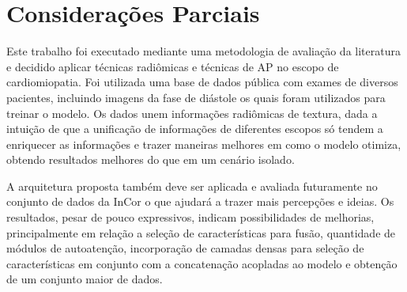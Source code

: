 \chapter{Considerações Parciais}
\label{chap:consideracoes_parciais}

Este trabalho foi executado mediante uma metodologia de avaliação da literatura e decidido aplicar técnicas radiômicas e técnicas de \gls{AP} no escopo de cardiomiopatia. Foi utilizada uma base de dados pública com exames de diversos pacientes, incluindo imagens da fase de diástole os quais foram utilizados para treinar o modelo. Os dados unem informações radiômicas de textura, dada a intuição de que a unificação de informações de diferentes escopos só tendem a enriquecer as informações e trazer maneiras melhores em como o modelo otimiza, obtendo resultados melhores do que em um cenário isolado.

A arquitetura proposta também deve ser aplicada e avaliada futuramente no conjunto de dados da \gls{InCor} o que ajudará a trazer mais percepções e ideias. Os resultados, pesar de pouco expressivos, indicam possibilidades de melhorias, principalmente em relação a seleção de características para fusão, quantidade de módulos de autoatenção, incorporação de camadas densas para seleção de características em conjunto com a concatenação acopladas ao modelo e obtenção de um conjunto maior de dados. 